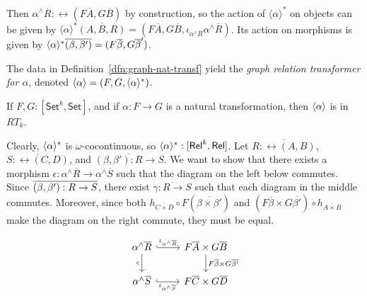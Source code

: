 \documentclass{lmcs}
\theoremstyle{plain}\newtheorem{satz}[thm]{Satz}
\newcommand{\set}{\mathsf{Set}}
\begin{document}
{\begin{defi}
\noindent
Then $\alpha^\wedge\overline{R} : \rel(F\overline{A}, G\overline{B})$
by construction, so the action of $\langle \alpha \rangle^*$ on
objects can be given by $\langle \alpha \rangle^* \overline{(A,B,R)} =
(F\overline{A}, G\overline{B}, \iota_{\alpha^\wedge
  \overline{R}}\alpha^\wedge\overline{R})$. Its action on morphisms is
given by $\langle {\alpha} \rangle^*\overline{(\beta, \beta')} =
(F\overline\beta, G\overline\beta')$.
\end{defi}

The data in Definition~\ref{dfn:graph-nat-transf} yield the {\em graph
  relation transformer for $\alpha$}, denoted $\langle {\alpha} \rangle = (F, G,
\langle {\alpha} \rangle^*)$.

\begin{lem}\label{lem:graph-reln-functors}
If $F,G : [\set^k,\set]$, and if $\alpha : F \to G$ is a natural
transformation, then $\langle {\alpha} \rangle$ is in $RT_k$.
\end{lem}
\proof
Clearly, $\langle {\alpha} \rangle^*$ is $\omega$-cocontinuous, so
$\langle {\alpha} \rangle^* : [\mathsf{Rel}^k,\mathsf{Rel}]$. Let $\overline{R :
  \rel(A, B)}$, $\overline{S : \rel(C, D)}$, and $\overline{(\beta,
  \beta') : R \to S}$. We want to show that there exists a morphism
$\epsilon : \alpha^\wedge\overline{R} \to \alpha^\wedge\overline{S}$
such that the diagram on the left below commutes. Since
$\overline{(\beta,\beta') : R \to S}$, there exist $\overline{\gamma : R \to
  S}$ such that each diagram in the middle commutes.
Moreover, since both $h_{\overline{C \times D}} \circ
F(\overline{\beta \times \beta'})$ and $(F\overline{\beta} \times
G\overline{\beta'}) \circ h_{\overline{A \times B}}$ make the diagram
on the right commute, they must be equal.
  \begin{minipage}[b]{0.25\linewidth}
 {\small    \[
    \begin{tikzcd}
        \alpha^\wedge\overline{R}
        \ar[r, hookrightarrow, "{\iota_{\alpha^\wedge\overline{R}}}"]
        \ar[d, "{\epsilon}"']
        & F\overline{A} \times G\overline{B}
        \ar[d, "{F\overline{\beta} \times G\overline{\beta'}}"] \\
        \alpha^\wedge\overline{S}
        \ar[r, hookrightarrow, "{\iota_{\alpha^\wedge\overline{S}}}"']
        & F\overline{C} \times G\overline{D}
    \end{tikzcd}
    \]}
\end{minipage}
}
\end{document}
